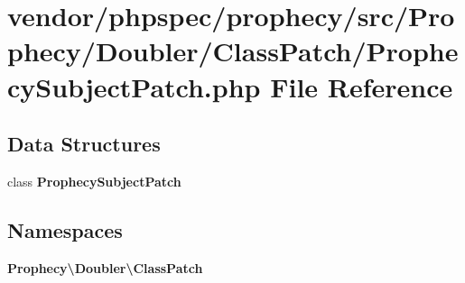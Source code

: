 \section{vendor/phpspec/prophecy/src/\+Prophecy/\+Doubler/\+Class\+Patch/\+Prophecy\+Subject\+Patch.php File Reference}
\label{_prophecy_subject_patch_8php}
\subsection*{Data Structures}
\begin{DoxyCompactItemize}
\item 
class {\bf Prophecy\+Subject\+Patch}
\end{DoxyCompactItemize}
\subsection*{Namespaces}
\begin{DoxyCompactItemize}
\item 
 {\bf Prophecy\textbackslash{}\+Doubler\textbackslash{}\+Class\+Patch}
\end{DoxyCompactItemize}
